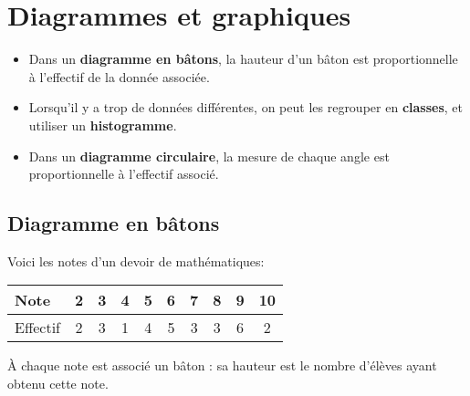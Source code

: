 \documentclass[../€Cours-complet/Cours-complet]{subfiles}
\begin{document}
\section{Diagrammes et graphiques}

\begin{cours}[diagrammes]
	\begin{itemize}
		\item Dans un \textbf{diagramme en bâtons}, la hauteur d'un bâton est proportionnelle à l'effectif de la donnée associée.
		\item Lorsqu'il y a trop de données différentes, on peut les regrouper en \textbf{classes}, et utiliser un \textbf{histogramme}.
		\item Dans un \textbf{diagramme circulaire}, la mesure de chaque angle est proportionnelle à l'effectif associé.
	\end{itemize}
\end{cours}

\subsection{Diagramme en bâtons}

\begin{exemple}
	Voici les notes d'un devoir de mathématiques:

	\begin{center}
		\begin{tabular}{|l|c|c|c|c|c|c|c|c|c|}
			\hline
			Note     & 2 & 3 & 4 & 5 & 6 & 7 & 8 & 9 & 10
			\\ \hline
			Effectif & 2 & 3 & 1 & 4 & 5 & 3 & 3 & 6 & 2
			\\ \hline
		\end{tabular}
	\end{center}

	À chaque note est associé un bâton : sa hauteur est le nombre d'élèves ayant obtenu cette note.

	\begin{center}
	\end{center}
\end{exemple}
\end{document}
